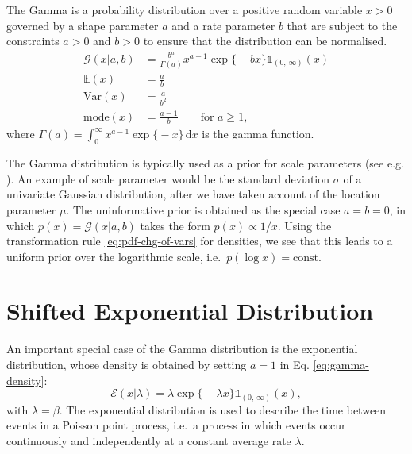 The Gamma is a probability distribution over a positive random variable $x > 0$ governed by a shape parameter $a$ and a rate parameter $b$ that are subject to the constraints $a > 0$ and $b > 0$ to ensure that the distribution can be normalised.
\begin{align}
	\mathcal{G}(x|a, b)
	&= \frac{b^a}{\Gamma(a)}x^{a-1}\exp\big\{-bx\big\}\mathds{1}_{(0,\,\infty)}(x)
	\label{eq:gamma-density} \\
	\mathbb{E}(x) &= \frac{a}{b}
	\\
	\mathrm{Var}(x) &= \frac{a}{b^2}
	\\
	\mathrm{mode}(x) &= \frac{a-1}{b}
	\qquad \text{for } a \geq 1,
\end{align}
where $\Gamma(a) = \int_{0}^{\infty} x^{a-1}\exp\big\{-x\big\}\,\mathrm{d}x$ is the gamma function.

The Gamma distribution is typically used as a prior for scale parameters (see e.g. \citep{berger85}). An example of scale parameter would be the standard deviation $\sigma$ of a univariate Gaussian distribution, after we have taken account of the location parameter $\mu$. The uninformative prior is obtained as the special case $a = b = 0$, in which $p(x) = \mathcal{G}(x|a, b)$ takes the form $p(x) \propto 1/x$. Using the transformation rule \eqref{eq:pdf-chg-of-vars} for densities, we see that this leads to a uniform prior over the logarithmic scale, i.e.\ $p(\log x) = \text{const}$.


\section{Shifted Exponential Distribution}
\label{sec:shifted-exponential-distribution}

An important special case of the Gamma distribution is the exponential distribution, whose density is obtained by setting $a = 1$ in Eq. \eqref{eq:gamma-density}:
\begin{equation}
	\mathcal{E}(x|\lambda)
	= \lambda\exp\Big\{-\lambda x\Big\}\mathds{1}_{(0,\,\infty)}(x),
\end{equation}
with $\lambda = \beta$. The exponential distribution is used to describe the time between events in a Poisson point process, i.e.\ a process in which events occur continuously and independently at a constant average rate $\lambda$.


